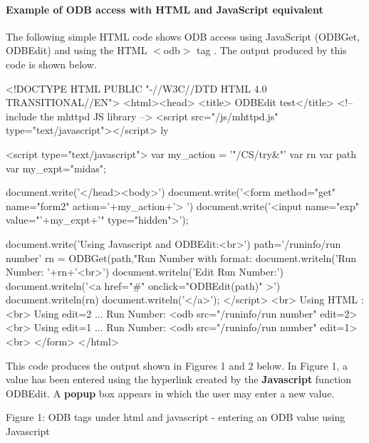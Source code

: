 \par
 \hypertarget{RC_mhttpd_custom_ODB_access_examples_RC_mhttpd_js_example1}{}\paragraph{Example of ODB access with HTML and JavaScript equivalent}\label{RC_mhttpd_custom_ODB_access_examples_RC_mhttpd_js_example1}
The following simple HTML code shows ODB access using JavaScript (ODBGet, ODBEdit) and using the HTML  $<$odb$>$ tag . The output produced by this code is shown below. 
\begin{DoxyCode}
<!DOCTYPE HTML PUBLIC "-//W3C//DTD HTML 4.0 TRANSITIONAL//EN">
<html><head>
<title> ODBEdit test</title>
<!-- include the mhttpd JS library -->
\htmlonly <script src="/js/mhttpd.js" type="text/javascript"></script> \endhtmlon
      ly

\htmlonly <script type="text/javascript">
var my_action = '"/CS/try&"'
var rn
var path
var my_expt="midas";

document.write('</head><body>')
document.write('<form method="get" name="form2" action='+my_action+'> ')
document.write('<input name="exp" value="'+my_expt+'" type="hidden">');

document.write('Using Javascript and ODBEdit:<br>')
path='/runinfo/run number'
rn = ODBGet(path,"Run Number with format: %
document.writeln('Run Number: '+rn+'<br>')
document.writeln('Edit Run Number:')
document.writeln('<a href="#" onclick="ODBEdit(path)" >')
document.writeln(rn)
document.writeln('</a>');
</script> \endhtmlonly
<br>
Using HTML :
<br>
Using edit=2 ...  Run Number:
<odb src="/runinfo/run number" edit=2>
<br>
Using edit=1 ...  Run Number:
<odb src="/runinfo/run number" edit=1>
<br>
</form>
</html>
\end{DoxyCode}
 \par


This code produces the output shown in Figures 1 and 2 below. In Figure 1, a value has been entered using the hyperlink created by the {\bfseries Javascript} function ODBEdit. A {\bfseries popup} box appears in which the user may enter a new value.

\par
\par
\par
 \begin{center} Figure 1: ODB tags under html and javascript -\/ entering an ODB value using Javascript \par
\par
\par
  \end{center}  \par
\par
\par


